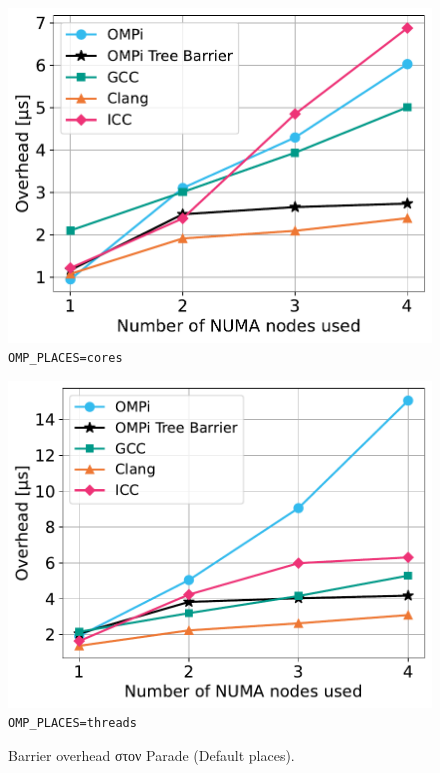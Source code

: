 \begin{figure}
    \centering
    \begin{minipage}{0.5\textwidth}
        \centering
        \includegraphics[width=1\textwidth]{Figures/epcc_20210823_175412/default-places_cores_close.pdf}
		\texttt{OMP\_PLACES=cores}
    \end{minipage}\hfill
    \begin{minipage}{0.5\textwidth}
        \centering
        \includegraphics[width=1\textwidth]{Figures/epcc_20210823_175412/default-places_threads_close.pdf}
        \texttt{OMP\_PLACES=threads}
    \end{minipage}
    \caption{Barrier overhead στον Parade (Default places).}
    \label{fig:bo-parade-default-places}
\end{figure}

